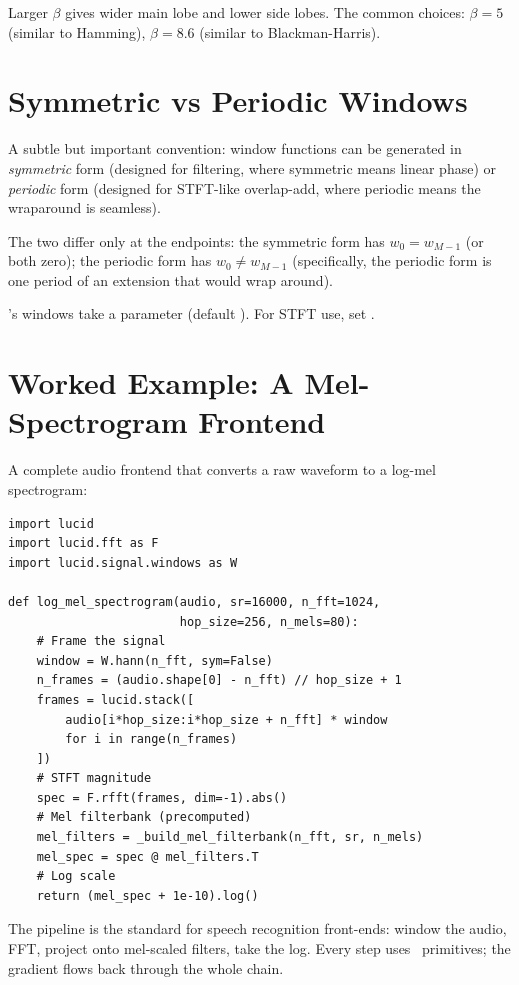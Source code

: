 Larger $\beta$ gives wider main lobe and lower side lobes. The
common choices: $\beta = 5$ (similar to Hamming), $\beta = 8.6$
(similar to Blackman-Harris).

\section{Symmetric vs Periodic Windows}
\label{sec:signal_windows:sym_periodic}

A subtle but important convention: window functions can be
generated in \emph{symmetric} form (designed for filtering, where
symmetric means linear phase) or \emph{periodic} form (designed
for STFT-like overlap-add, where periodic means the wraparound
is seamless).

The two differ only at the endpoints: the symmetric form has
$w_0 = w_{M-1}$ (or both zero); the periodic form has $w_0 \neq
w_{M-1}$ (specifically, the periodic form is one period of an
extension that would wrap around).

\Lucid's windows take a  parameter (default
). For STFT use, set .

\section{Worked Example: A Mel-Spectrogram Frontend}
\label{sec:signal_windows:mel_example}

A complete audio frontend that converts a raw waveform to a
log-mel spectrogram:

\begin{lstlisting}[style=lucid,language=LucidPython]
import lucid
import lucid.fft as F
import lucid.signal.windows as W

def log_mel_spectrogram(audio, sr=16000, n_fft=1024,
                        hop_size=256, n_mels=80):
    # Frame the signal
    window = W.hann(n_fft, sym=False)
    n_frames = (audio.shape[0] - n_fft) // hop_size + 1
    frames = lucid.stack([
        audio[i*hop_size:i*hop_size + n_fft] * window
        for i in range(n_frames)
    ])
    # STFT magnitude
    spec = F.rfft(frames, dim=-1).abs()
    # Mel filterbank (precomputed)
    mel_filters = _build_mel_filterbank(n_fft, sr, n_mels)
    mel_spec = spec @ mel_filters.T
    # Log scale
    return (mel_spec + 1e-10).log()
\end{lstlisting}

The pipeline is the standard for speech recognition front-ends:
window the audio, FFT, project onto mel-scaled filters, take the
log. Every step uses \Lucid\ primitives; the gradient flows back
through the whole chain.

